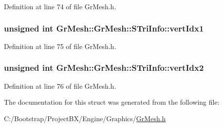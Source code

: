 Definition at line 74 of file GrMesh.h.\hypertarget{struct_gr_mesh_1_1_s_tri_info_f5c9d056b0352c52ff90d8e93c5c2a8d}{
\subsubsection[{vertIdx1}]{\setlength{\rightskip}{0pt plus 5cm}unsigned int GrMesh::GrMesh::STriInfo::vertIdx1}}
\label{struct_gr_mesh_1_1_s_tri_info_f5c9d056b0352c52ff90d8e93c5c2a8d}




Definition at line 75 of file GrMesh.h.\hypertarget{struct_gr_mesh_1_1_s_tri_info_34bdea9839ffbe456dee3b49b1c95843}{
\subsubsection[{vertIdx2}]{\setlength{\rightskip}{0pt plus 5cm}unsigned int GrMesh::GrMesh::STriInfo::vertIdx2}}
\label{struct_gr_mesh_1_1_s_tri_info_34bdea9839ffbe456dee3b49b1c95843}




Definition at line 76 of file GrMesh.h.

The documentation for this struct was generated from the following file:\begin{CompactItemize}
\item 
C:/Bootstrap/ProjectBX/Engine/Graphics/\hyperlink{_gr_mesh_8h}{GrMesh.h}\end{CompactItemize}
